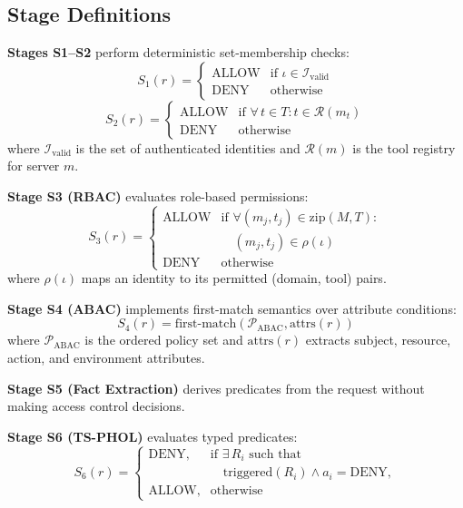 \documentclass[10pt,a4paper,twocolumn]{article}
\begin{document}
\subsection{Stage Definitions}
\label{sec:stage_definitions}

\textbf{Stages S1--S2} perform deterministic set-membership checks:
\begin{equation}
S_1(r) = \begin{cases} \text{ALLOW} & \text{if } \iota \in \mathcal{I}_{\text{valid}} \\ \text{DENY} & \text{otherwise} \end{cases}
\end{equation}
\begin{equation}
S_2(r) = \begin{cases} \text{ALLOW} & \text{if } \forall\, t \in T : t \in \mathcal{R}(m_t) \\ \text{DENY} & \text{otherwise} \end{cases}
\end{equation}
where $\mathcal{I}_{\text{valid}}$ is the set of authenticated identities and $\mathcal{R}(m)$ is the tool registry for server $m$.

\textbf{Stage S3 (RBAC)} evaluates role-based permissions:
\begin{equation}
S_3(r) = \begin{cases}
\text{ALLOW} & \text{if } \forall (m_j, t_j) \in \text{zip}(M,T)\!:\\
 & \quad (m_j, t_j) \in \rho(\iota) \\
\text{DENY} & \text{otherwise}
\end{cases}
\label{eq:rbac}
\end{equation}
where $\rho(\iota)$ maps an identity to its permitted (domain, tool) pairs.

\textbf{Stage S4 (ABAC)} implements first-match semantics over attribute conditions:
\begin{equation}
S_4(r) = \text{first-match}(\mathcal{P}_{\text{ABAC}}, \text{attrs}(r))
\label{eq:abac}
\end{equation}
where $\mathcal{P}_{\text{ABAC}}$ is the ordered policy set and $\text{attrs}(r)$ extracts subject, resource, action, and environment attributes.

\textbf{Stage S5 (Fact Extraction)} derives predicates from the request without making access control decisions.

\textbf{Stage S6 (TS-PHOL)} evaluates typed predicates:
\begin{equation}
S_6(r) = \begin{cases}
\text{DENY}, & \text{if } \exists\, R_i \text{ such that} \\
& \quad \text{triggered}(R_i) \land a_i = \text{DENY}, \\
\text{ALLOW}, & \text{otherwise}
\end{cases}
\label{eq:tsphol}
\end{equation}
\end{document}

